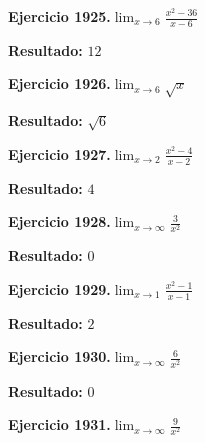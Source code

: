 \documentclass[10pt,a4paper]{article}
\begin{document}
\begin{ejbox}
\textbf{Ejercicio 1925.}\quad $\lim_{x\to 6} \frac{x^2-36}{x-6}$
\end{ejbox}

\begin{solbox}
\textbf{Resultado:} \(\displaystyle 12\)
\end{solbox}

\begin{ejbox}
\textbf{Ejercicio 1926.}\quad $\lim_{x\to 6} \sqrt{x}$
\end{ejbox}

\begin{solbox}
\textbf{Resultado:} \(\displaystyle \sqrt{6}\)
\end{solbox}

\newpage
\begin{ejbox}
\textbf{Ejercicio 1927.}\quad $\lim_{x\to 2} \frac{x^2-4}{x-2}$
\end{ejbox}

\begin{solbox}
\textbf{Resultado:} \(\displaystyle 4\)
\end{solbox}

\begin{ejbox}
\textbf{Ejercicio 1928.}\quad $\lim_{x\to \infty} \frac{3}{x^2}$
\end{ejbox}

\begin{solbox}
\textbf{Resultado:} \(\displaystyle 0\)
\end{solbox}

\begin{ejbox}
\textbf{Ejercicio 1929.}\quad $\lim_{x\to 1} \frac{x^2-1}{x-1}$
\end{ejbox}

\begin{solbox}
\textbf{Resultado:} \(\displaystyle 2\)
\end{solbox}

\newpage
\begin{ejbox}
\textbf{Ejercicio 1930.}\quad $\lim_{x\to \infty} \frac{6}{x^2}$
\end{ejbox}

\begin{solbox}
\textbf{Resultado:} \(\displaystyle 0\)
\end{solbox}

\begin{ejbox}
\textbf{Ejercicio 1931.}\quad $\lim_{x\to \infty} \frac{9}{x^2}$
\end{ejbox}
\end{document}
